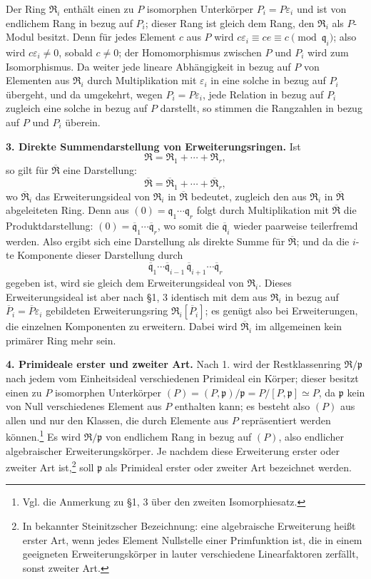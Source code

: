 \documentclass[11pt]{article}
\begin{document}
Der Ring $\mathfrak R_i$ enthält einen zu $P$ isomorphen Unterkörper $P_i=P\varepsilon_i$ und ist von endlichem Rang in bezug auf $P_i$; dieser Rang ist gleich dem Rang, den $\mathfrak R_i$ als $P$-Modul besitzt. Denn für jedes Element $c$ aus $P$ wird $c\varepsilon_i\equiv ce\equiv c\pmod{\mathfrak q_i}$; also wird $c\varepsilon_i\ne 0$, sobald $c\ne0$; der Homomorphismus zwischen $P$ und $P_i$ wird zum Isomorphismus. Da weiter jede lineare Abhängigkeit in bezug auf $P$ von Elementen aus $\mathfrak R_i$ durch Multiplikation mit $\varepsilon_i$ in eine solche in bezug auf $P_i$ übergeht, und da umgekehrt, wegen $P_i=P\varepsilon_i$, jede Relation in bezug auf $P_i$ zugleich eine solche in bezug auf $P$ darstellt, so stimmen die Rangzahlen in bezug auf $P$ und $P_i$ überein.

\textbf{3. Direkte Summendarstellung von Erweiterungsringen.} Ist
\[
   \mathfrak R=\mathfrak R_1+\cdots+\mathfrak R_r,
\]
so gilt für $\overline{\mathfrak R}$ eine Darstellung:
\[
   \overline{\mathfrak R}=\overline{\mathfrak R}_1+\cdots+\overline{\mathfrak R}_r,
\]
wo $\overline{\mathfrak R}_i$ das Erweiterungsideal von $\mathfrak R_i$ in $\overline{\mathfrak R}$ bedeutet, zugleich den aus $\mathfrak R_i$ in $\overline{\mathfrak R}$ abgeleiteten Ring. Denn aus $(0)=\mathfrak q_1\cdots\mathfrak q_r$ folgt durch Multiplikation mit $\overline{\mathfrak R}$ die Produktdarstellung: $(0)=\overline{\mathfrak q}_1\cdots\overline{\mathfrak q}_r$, wo somit die $\overline{\mathfrak q}_i$ wieder paarweise teilerfremd werden. Also ergibt sich eine Darstellung als direkte Summe für $\overline{\mathfrak R}$; und da die $i$-te Komponente dieser Darstellung durch
\[
   \overline{\mathfrak q}_1\cdots\overline{\mathfrak q}_{i-1}\,
   \overline{\mathfrak q}_{i+1}\cdots\overline{\mathfrak q}_r
\]
gegeben ist, wird sie gleich dem Erweiterungsideal von $\mathfrak R_i$. Dieses Erweiterungsideal ist aber nach \S 1, 3 identisch mit dem aus $\mathfrak R_i$ in bezug auf $\overline P_i=\overline P\varepsilon_i$ gebildeten Erweiterungsring $\mathfrak R_i[\overline P_i]$; es genügt also bei Erweiterungen, die einzelnen Komponenten zu erweitern. Dabei wird $\overline{\mathfrak R}_i$ im allgemeinen kein primärer Ring mehr sein.

\textbf{4. Primideale erster und zweiter Art.} Nach 1. wird der Restklassenring $\mathfrak R/\mathfrak p$ nach jedem vom Einheitsideal verschiedenen Primideal ein Körper; dieser besitzt einen zu $P$ isomorphen Unterkörper $(P)=(P,\mathfrak p)/\mathfrak p=P/[P,\mathfrak p]\simeq P$, da $\mathfrak p$ kein von Null verschiedenes Element aus $P$ enthalten kann; es besteht also $(P)$ aus allen und nur den Klassen, die durch Elemente aus $P$ repräsentiert werden können.\footnote{Vgl. die Anmerkung zu \S 1, 3 über den zweiten Isomorphiesatz.} Es wird $\mathfrak R/\mathfrak p$ von endlichem Rang in bezug auf $(P)$, also endlicher algebraischer Erweiterungskörper. Je nachdem diese Erweiterung erster oder zweiter Art ist,\footnote{In bekannter Steinitzscher Bezeichnung: eine algebraische Erweiterung heißt erster Art, wenn jedes Element Nullstelle einer Primfunktion ist, die in einem geeigneten Erweiterungskörper in lauter verschiedene Linearfaktoren zerfällt, sonst zweiter Art.} soll $\mathfrak p$ als Primideal erster oder zweiter Art bezeichnet werden.
\end{document}
